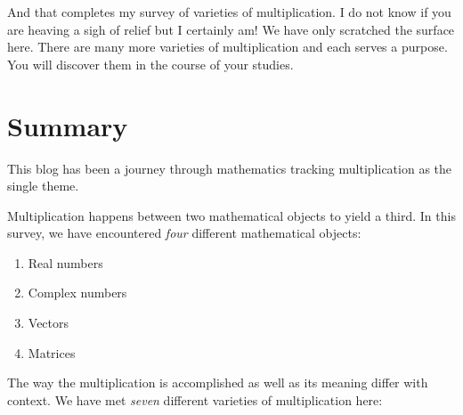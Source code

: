 \documentclass[
  a4paper,
]{article}
\providecommand{\tightlist}{%
  \setlength{\itemsep}{0pt}\setlength{\parskip}{0pt}}
\begin{document}
And that completes my survey of varieties of multiplication. I do not
know if you are heaving a sigh of relief but I certainly am! We have
only scratched the surface here. There are many more varieties of
multiplication and each serves a purpose. You will discover them in the
course of your studies.

\hypertarget{summary}{%
\section{Summary}\label{summary}}

This blog has been a journey through mathematics tracking multiplication
as the single theme.

Multiplication happens between two mathematical objects to yield a
third. In this survey, we have encountered \emph{four} different
mathematical objects:

\begin{enumerate}
\tightlist
\item
  Real numbers
\item
  Complex numbers
\item
  Vectors
\item
  Matrices
\end{enumerate}

The way the multiplication is accomplished as well as its meaning differ
with context. We have met \emph{seven} different varieties of
multiplication here:
\end{document}
